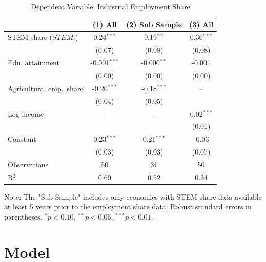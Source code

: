 \documentclass[12pt]{article} %
\theoremstyle{definition}
\begin{document}
\begin{table}[H]
\centering
\begin{threeparttable}
\caption{Dependent Variable: Industrial Employment Share}
\label{tab:industry_reg}
\begin{tabular*}{\textwidth}{@{\extracolsep{\fill}}lccc}
\toprule
                    & (1) All & (2) Sub Sample & (3) All  \\
\midrule
STEM share ($STEM_i$)         & 0.24$^{***}$ & 0.19$^{**}$  & 0.30$^{***}$ \\
                    & (0.07)       & (0.08)       & (0.08)      \\
Edu. attainment     & -0.001$^{***}$ & -0.000$^{**}$ & -0.001     \\
                    & (0.00)       & (0.00)       & (0.00)     \\
Agricultural emp.\ share
                    & -0.20$^{***}$ & -0.18$^{***}$ & --         \\
                    & (0.04)       & (0.05)       &           \\
Log income          & --           & --           & 0.02$^{***}$ \\
                    &             &             & (0.01)    \\
Constant            & 0.23$^{***}$ & 0.21$^{***}$ & -0.03     \\
                    & (0.03)      & (0.03)      & (0.07)    \\
\midrule
Observations        & 50          & 31          & 50        \\
R$^{2}$             & 0.60        & 0.52        & 0.34      \\
\bottomrule
\end{tabular*}
\begin{tablenotes}[flushleft]
\footnotesize
\item Note: The "Sub Sample" includes only economies with STEM share data available at least 5 years  prior to the employment share data. 
Robust standard errors in parentheses.
$^{*}p<0.10$, $^{**}p<0.05$, $^{***}p<0.01$.
\end{tablenotes}
\end{threeparttable}
\end{table}












\section{Model}\label{section model}
\end{document}
